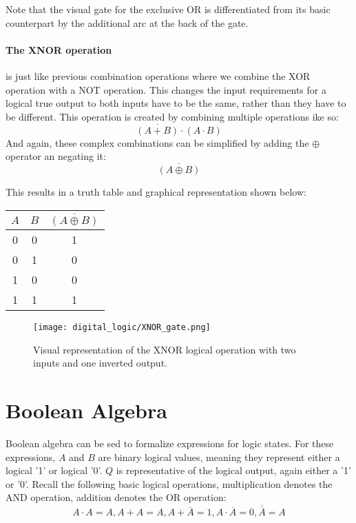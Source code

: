     Note that the visual gate for the exclusive OR is differentiated from its basic counterpart by the additional arc at the back of the gate.

    \paragraph*{The XNOR operation} is just like previous combination operations where we combine the XOR operation with a NOT operation.
    This changes the input requirements for a logical true output to both inputs have to be the same, rather than they have to be different.
    This operation is created by combining multiple operations ike so:
    \begin{equation*}
        \overline{(A+B)} \cdot (A \cdot B)
    \end{equation*}
    And again, these complex combinations can be simplified by adding the $\oplus$ operator an negating it:
    \begin{equation*}
        \overline{(A \oplus B)}
    \end{equation*}

    This results in a truth table and graphical representation shown below:
    \begin{table}[h!]
        \begin{tabular}{c c | c}
            \toprule
            $A$ & $B$ & $\overline{(A \oplus B)}$  \\
            \midrule
             0  &  0  &    1    \\
             0  &  1  &    0    \\
             1  &  0  &    0    \\
             1  &  1  &    1    \\
            \bottomrule
        \end{tabular}
    \end{table}

    \begin{figure}[h!]
        \texttt{[image: digital\_logic/XNOR\_gate.png]}
        \caption[XNOR Gate]{Visual representation of the XNOR logical operation with two inputs and one inverted output.}
    \end{figure}

\section{Boolean Algebra}
Boolean algebra can be sed to formalize expressions for logic states.
For these expressions, $A$ and $B$ are binary logical values, meaning they represent either a logical '1' or logical '0'.
$Q$ is representative of the logical output, again either a '1' or '0'.
Recall the following basic logical operations, multiplication denotes the AND operation, addition denotes the OR operation:
\begin{equation*}
    A \cdot A = A, A + A = A, A + \overline{A} = 1, A \cdot \overline{A} = 0, \overline{\overline{A}} = A
\end{equation*}

